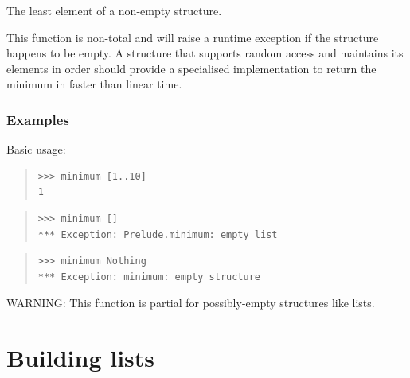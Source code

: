 \begin{haddockdesc}
\item[\begin{tabular}{@{}l}
minimum :: (Foldable t, Ord a) => t a -> a
\end{tabular}]
{\haddockbegindoc
The least element of a non-empty structure.\par
This function is non-total and will raise a runtime exception if the
 structure happens to be empty.  A structure that supports random access
 and maintains its elements in order should provide a specialised
 implementation to return the minimum in faster than linear time.\par
\subsubsection*{\textbf{Examples}}
Basic usage:\par
\begin{quote}
{\haddockverb\begin{verbatim}
>>> minimum [1..10]
1

\end{verbatim}}
\end{quote}
\begin{quote}
{\haddockverb\begin{verbatim}
>>> minimum []
*** Exception: Prelude.minimum: empty list

\end{verbatim}}
\end{quote}
\begin{quote}
{\haddockverb\begin{verbatim}
>>> minimum Nothing
*** Exception: minimum: empty structure

\end{verbatim}}
\end{quote}
WARNING: This function is partial for possibly-empty structures like lists.\par}
\end{haddockdesc}
\section{Building lists}
